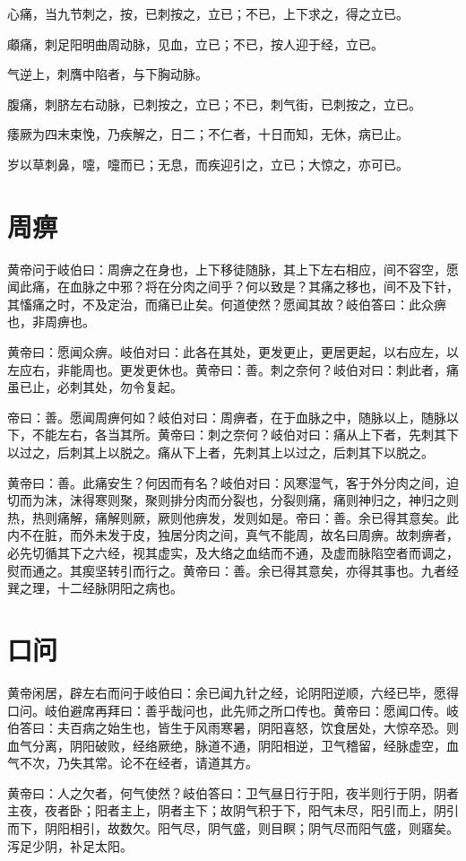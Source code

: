 \documentclass[a4paper,12pt,UTF8,twoside]{ctexbook}
\begin{document}
	心痛，当九节刺之，按，已刺按之，立已；不已，上下求之，得之立已。
	
	顑痛，刺足阳明曲周动脉，见血，立已；不已，按人迎于经，立已。
	
	气逆上，刺膺中陷者，与下胸动脉。
	
	腹痛，刺脐左右动脉，已刺按之，立已；不已，刺气街，已刺按之，立已。
	
	痿厥为四末束悗，乃疾解之，日二；不仁者，十日而知，无休，病已止。
	
	岁以草刺鼻，嚏，嚏而已；无息，而疾迎引之，立已；大惊之，亦可已。
	\chapter{周痹}
	
	黄帝问于岐伯曰：周痹之在身也，上下移徒随脉，其上下左右相应，间不容空，愿闻此痛，在血脉之中邪？将在分肉之间乎？何以致是？其痛之移也，间不及下针，其慉痛之时，不及定治，而痛已止矣。何道使然？愿闻其故？岐伯答曰：此众痹也，非周痹也。
	
	黄帝曰：愿闻众痹。岐伯对曰：此各在其处，更发更止，更居更起，以右应左，以左应右，非能周也。更发更休也。黄帝曰：善。刺之奈何？岐伯对曰：刺此者，痛虽已止，必刺其处，勿令复起。
	
	帝曰：善。愿闻周痹何如？岐伯对曰：周痹者，在于血脉之中，随脉以上，随脉以下，不能左右，各当其所。黄帝曰：刺之奈何？岐伯对曰：痛从上下者，先刺其下以过之，后刺其上以脱之。痛从下上者，先刺其上以过之，后刺其下以脱之。
	
	黄帝曰：善。此痛安生？何因而有名？岐伯对曰：风寒湿气，客于外分肉之间，迫切而为沫，沫得寒则聚，聚则排分肉而分裂也，分裂则痛，痛则神归之，神归之则热，热则痛解，痛解则厥，厥则他痹发，发则如是。帝曰：善。余已得其意矣。此内不在脏，而外未发于皮，独居分肉之间，真气不能周，故名曰周痹。故刺痹者，必先切循其下之六经，视其虚实，及大络之血结而不通，及虚而脉陷空者而调之，熨而通之。其瘈坚转引而行之。黄帝曰：善。余已得其意矣，亦得其事也。九者经巽之理，十二经脉阴阳之病也。
	\chapter{口问}
	
	黄帝闲居，辟左右而问于岐伯曰：余已闻九针之经，论阴阳逆顺，六经已毕，愿得口问。岐伯避席再拜曰：善乎哉问也，此先师之所口传也。黄帝曰：愿闻口传。岐伯答曰：夫百病之始生也，皆生于风雨寒暑，阴阳喜怒，饮食居处，大惊卒恐。则血气分离，阴阳破败，经络厥绝，脉道不通，阴阳相逆，卫气稽留，经脉虚空，血气不次，乃失其常。论不在经者，请道其方。
	
	黄帝曰：人之欠者，何气使然？岐伯答曰：卫气昼日行于阳，夜半则行于阴，阴者主夜，夜者卧；阳者主上，阴者主下；故阴气积于下，阳气未尽，阳引而上，阴引而下，阴阳相引，故数欠。阳气尽，阴气盛，则目瞑；阴气尽而阳气盛，则寤矣。泻足少阴，补足太阳。
	
\end{document}

